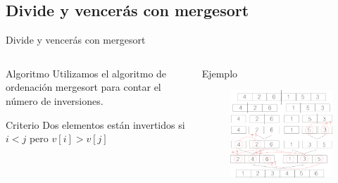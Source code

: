 \subsection{Divide y vencerás con mergesort}
\begin{frame}{Divide y vencerás con mergesort}
	\begin{columns}
		
		\begin{column}{4cm}
		\begin{block}{Algoritmo}
		Utilizamos el algoritmo de ordenación mergesort para contar el número de inversiones.\\
		\end{block}	
		
		\begin{block}{Criterio}
		Dos elementos están invertidos si $i < j$ pero $v[i] > v[j]$\\
		\end{block}	
		\end{column}
			
		\begin{column}{6cm}
		\begin{exampleblock}{Ejemplo}
		\begin{figure}[h]
			\centering
			\includegraphics[width=1\textwidth]{Imagenes/esquema_merge.png}
		\end{figure}
		\end{exampleblock}
		\end{column}
		
	\end{columns}
\end{frame}

